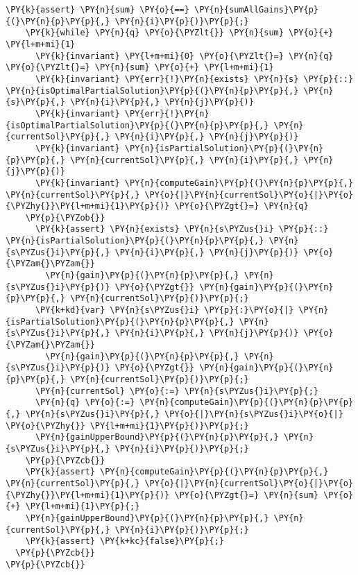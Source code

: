 \begin{sloppypar}
\begin{enumerate}
\begin{Verbatim}[commandchars=\\\{\}]
    \PY{k}{assert} \PY{n}{sum} \PY{o}{==} \PY{n}{sumAllGains}\PY{p}{(}\PY{n}{p}\PY{p}{,} \PY{n}{i}\PY{p}{)}\PY{p}{;}
    \PY{k}{while} \PY{n}{q} \PY{o}{\PYZlt{}} \PY{n}{sum} \PY{o}{+} \PY{l+m+mi}{1}
      \PY{k}{invariant} \PY{l+m+mi}{0} \PY{o}{\PYZlt{}=} \PY{n}{q} \PY{o}{\PYZlt{}=} \PY{n}{sum} \PY{o}{+} \PY{l+m+mi}{1}
      \PY{k}{invariant} \PY{err}{!}\PY{n}{exists} \PY{n}{s} \PY{p}{::} \PY{n}{isOptimalPartialSolution}\PY{p}{(}\PY{n}{p}\PY{p}{,} \PY{n}{s}\PY{p}{,} \PY{n}{i}\PY{p}{,} \PY{n}{j}\PY{p}{)}
      \PY{k}{invariant} \PY{err}{!}\PY{n}{isOptimalPartialSolution}\PY{p}{(}\PY{n}{p}\PY{p}{,} \PY{n}{currentSol}\PY{p}{,} \PY{n}{i}\PY{p}{,} \PY{n}{j}\PY{p}{)}
      \PY{k}{invariant} \PY{n}{isPartialSolution}\PY{p}{(}\PY{n}{p}\PY{p}{,} \PY{n}{currentSol}\PY{p}{,} \PY{n}{i}\PY{p}{,} \PY{n}{j}\PY{p}{)}
      \PY{k}{invariant} \PY{n}{computeGain}\PY{p}{(}\PY{n}{p}\PY{p}{,} \PY{n}{currentSol}\PY{p}{,} \PY{o}{|}\PY{n}{currentSol}\PY{o}{|}\PY{o}{\PYZhy{}}\PY{l+m+mi}{1}\PY{p}{)} \PY{o}{\PYZgt{}=} \PY{n}{q}
    \PY{p}{\PYZob{}}
      \PY{k}{assert} \PY{n}{exists} \PY{n}{s\PYZus{}i} \PY{p}{::} \PY{n}{isPartialSolution}\PY{p}{(}\PY{n}{p}\PY{p}{,} \PY{n}{s\PYZus{}i}\PY{p}{,} \PY{n}{i}\PY{p}{,} \PY{n}{j}\PY{p}{)} \PY{o}{\PYZam{}\PYZam{}} 
        \PY{n}{gain}\PY{p}{(}\PY{n}{p}\PY{p}{,} \PY{n}{s\PYZus{}i}\PY{p}{)} \PY{o}{\PYZgt{}} \PY{n}{gain}\PY{p}{(}\PY{n}{p}\PY{p}{,} \PY{n}{currentSol}\PY{p}{)}\PY{p}{;}
      \PY{k+kd}{var} \PY{n}{s\PYZus{}i} \PY{p}{:}\PY{o}{|} \PY{n}{isPartialSolution}\PY{p}{(}\PY{n}{p}\PY{p}{,} \PY{n}{s\PYZus{}i}\PY{p}{,} \PY{n}{i}\PY{p}{,} \PY{n}{j}\PY{p}{)} \PY{o}{\PYZam{}\PYZam{}} 
        \PY{n}{gain}\PY{p}{(}\PY{n}{p}\PY{p}{,} \PY{n}{s\PYZus{}i}\PY{p}{)} \PY{o}{\PYZgt{}} \PY{n}{gain}\PY{p}{(}\PY{n}{p}\PY{p}{,} \PY{n}{currentSol}\PY{p}{)}\PY{p}{;}
      \PY{n}{currentSol} \PY{o}{:=} \PY{n}{s\PYZus{}i}\PY{p}{;}
      \PY{n}{q} \PY{o}{:=} \PY{n}{computeGain}\PY{p}{(}\PY{n}{p}\PY{p}{,} \PY{n}{s\PYZus{}i}\PY{p}{,} \PY{o}{|}\PY{n}{s\PYZus{}i}\PY{o}{|} \PY{o}{\PYZhy{}} \PY{l+m+mi}{1}\PY{p}{)}\PY{p}{;}
      \PY{n}{gainUpperBound}\PY{p}{(}\PY{n}{p}\PY{p}{,} \PY{n}{s\PYZus{}i}\PY{p}{,} \PY{n}{i}\PY{p}{)}\PY{p}{;}
    \PY{p}{\PYZcb{}}
    \PY{k}{assert} \PY{n}{computeGain}\PY{p}{(}\PY{n}{p}\PY{p}{,} \PY{n}{currentSol}\PY{p}{,} \PY{o}{|}\PY{n}{currentSol}\PY{o}{|}\PY{o}{\PYZhy{}}\PY{l+m+mi}{1}\PY{p}{)} \PY{o}{\PYZgt{}=} \PY{n}{sum} \PY{o}{+} \PY{l+m+mi}{1}\PY{p}{;}
    \PY{n}{gainUpperBound}\PY{p}{(}\PY{n}{p}\PY{p}{,} \PY{n}{currentSol}\PY{p}{,} \PY{n}{i}\PY{p}{)}\PY{p}{;}
    \PY{k}{assert} \PY{k+kc}{false}\PY{p}{;}
  \PY{p}{\PYZcb{}}
\PY{p}{\PYZcb{}}

\end{Verbatim}
\end{enumerate}
\end{sloppypar}
